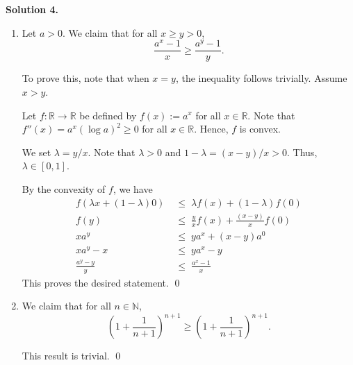 \documentclass[10pt]{article}
\begin{document}
        \textbf{Solution 4.}
        \begin{enumerate}
                \item Let $a > 0$. We claim that for all $x \ge y > 0$,
                \[ \frac{a^x - 1}{x} \ge \frac{a^y - 1}{y}. \]

                To prove this, note that when $x = y$, the inequality follows trivially. Assume $x > y$.

                Let $f\colon \mathbb{R} \to \mathbb{R}$ be defined by $f(x) := a^x$ for all $x \in \mathbb{R}$.
                Note that $f''(x) = a^x (\log{a})^2 \ge 0$ for all $x \in \mathbb{R}$. Hence, $f$ is convex.

                We set $\lambda = y/x$. Note that $\lambda > 0$ and $1 - \lambda = (x - y) / x > 0$. Thus, $\lambda \in [0, 1]$.

                By the convexity of $f$, we have
                \begin{align*}
                        f(\lambda x + (1 - \lambda) 0) \;&\le\; \lambda f(x) + (1 - \lambda) f(0) \\
                        f(y) \;&\le\; \frac{y}{x}f(x) + \frac{(x - y)}{x} f(0) \\
                        x a^y \;&\le\; y a^x + (x - y) a^0 \\
                        x a^y - x \;&\le\; y a^x - y \\
                        \frac{a^y - y}{y} \;&\le\; \frac{a^x - 1}{x}
                \end{align*}
                This proves the desired statement. \qed\\

                \item We claim that for all $n \in \mathbb{N}$,
                \[\left(1 + \frac{1}{n + 1}\right)^{n + 1} \ge \left(1 + \frac{1}{n + 1}\right)^{n + 1}.\]

                This result is trivial. \qed
        \end{enumerate}
\end{document}
